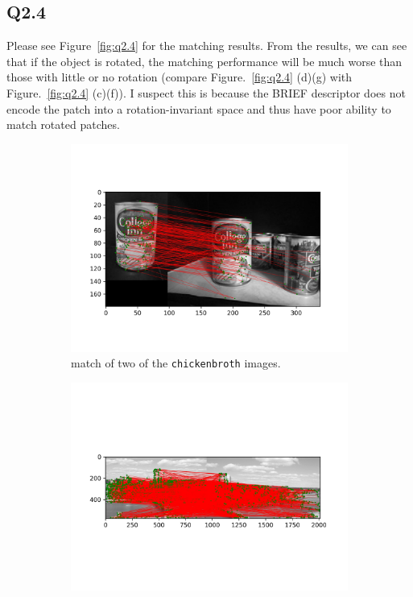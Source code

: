 \documentclass[11pt]{article}
\newcommand{\code}[1]{\texttt{#1}}
\begin{document}
\newpage

\subsection*{Q2.4}

Please see Figure~\ref{fig:q2.4} for the matching results. From the results, we can see that if the object is rotated, the matching performance will be much worse than those with little or no rotation (compare Figure.~\ref{fig:q2.4} (d)(g) with Figure.~\ref{fig:q2.4} (c)(f)). I suspect this is because the BRIEF descriptor does not encode the patch into a rotation-invariant space and thus have poor ability to match rotated patches.

\begin{figure}[h!] \label{fig:q2.4}
    \begin{subfigure}{.49\textwidth}
      \centering
      \includegraphics[width=.8\linewidth]{../results/chickenbroth_01_match.jpg}
      \caption{match of two of the \code{chickenbroth} images.}
    \end{subfigure}
    \begin{subfigure}{.49\textwidth}
      \centering
      \includegraphics[width=.8\linewidth]{../results/incline_match.jpg}

\end{subfigure}
\end{figure}
\end{document}
